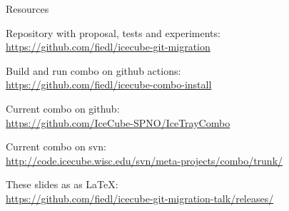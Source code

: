 
\begin{frame}{Resources}
  \begin{center}

    Repository with proposal, tests and experiments: \\
    \url{https://github.com/fiedl/icecube-git-migration}

    \vspace{1em}

    Build and run combo on github actions: \\
    \url{https://github.com/fiedl/icecube-combo-install}

    \vspace{1em}

    Current combo on github: \\
    \url{https://github.com/IceCube-SPNO/IceTrayCombo}

    \vspace{1em}

    Current combo on svn: \\
    \url{http://code.icecube.wisc.edu/svn/meta-projects/combo/trunk/}

    \vspace{1em}

    These slides as as \LaTeX: \\
    \url{https://github.com/fiedl/icecube-git-migration-talk/releases/}

  \end{center}
\end{frame}